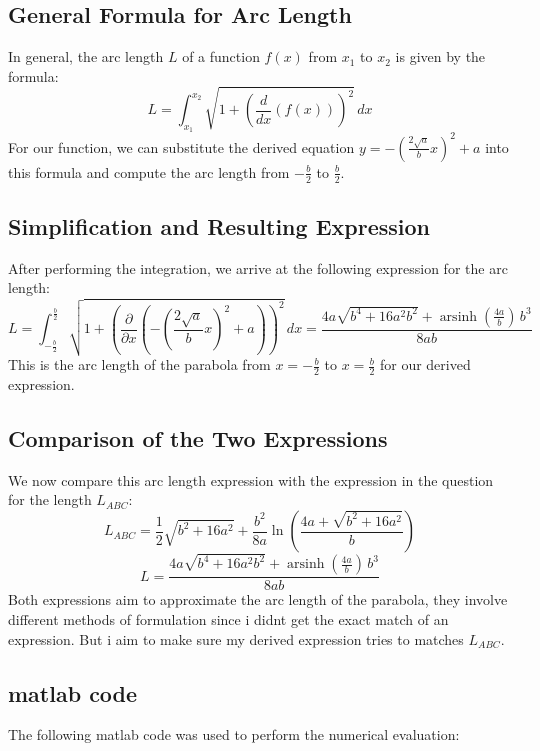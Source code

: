 \documentclass[a4paper, 12pt]{report}
\def\link{blue!50!black}
\begin{document}
    \subsection{General Formula for Arc Length}
    In general, the arc length $L$ of a function $f(x)$ from $x_1$ to $x_2$ is given by the formula:
    \[L = \int_{x_1}^{x_2} \sqrt{1 + \left( \frac{d}{dx}(f(x)) \right)^2} \, dx\]
    For our function, we can substitute the derived equation $y = -\left(\frac{2\sqrt{a}}{b}x\right)^2 + a$ into this formula and compute the arc length from $-\frac{b}{2}$ to $\frac{b}{2}$.
    \subsection{Simplification and Resulting Expression}
    After performing the integration, we arrive at the following expression for the arc length:
    \[L = \int_{-\frac{b}{2}}^{\frac{b}{2}} \sqrt{1 + \left(\frac{\partial}{\partial x}\left(-\left(\frac{2\sqrt{a}}{b}x\right)^2 + a\right)\right)^2} \, dx = \frac{4a \sqrt{b^{4} + 16a^{2} b^{2}} + \operatorname{arsinh}\left(\frac{4a}{b}\right) \, b^{3}}{8ab}\]
    This is the arc length of the parabola from $x = -\frac{b}{2}$ to $x = \frac{b}{2}$ for our derived expression.
    \subsection{Comparison of the Two Expressions}
    We now compare this arc length expression with the expression in the question for the length $L_{ABC}$:
    \[L_{ABC} = \frac{1}{2}\sqrt{b^2 + 16a^2} + \frac{b^2}{8a}\ln\left(\frac{4a + \sqrt{b^2 + 16a^2}}{b}\right)\]
    \[L = \frac{4a \sqrt{b^{4} + 16a^{2} b^{2}} + \operatorname{arsinh}\left(\frac{4a}{b}\right) \, b^{3}}{8ab}\]
    Both expressions aim to approximate the arc length of the parabola, they involve different methods of formulation since i didnt get the exact match of an expression. But i aim to make sure my derived expression tries to matches $L_{ABC}$.
    \subsection{matlab code}
    The following matlab code was used to perform the numerical evaluation:
    
    \newpage
\end{document}
